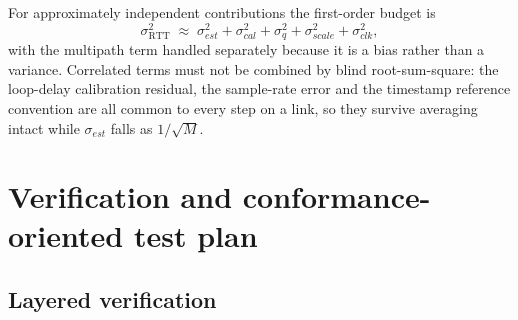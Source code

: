 \documentclass[11pt,a4paper]{article}
\newcommand{\RTT}{\mathrm{RTT}}
\begin{document}
For approximately independent contributions the first-order budget is
\begin{equation}
\sigma_{\RTT}^2 \;\approx\; \sigma_{est}^2 + \sigma_{cal}^2 + \sigma_{q}^2 + \sigma_{scale}^2
   + \sigma_{clk}^2 ,
\label{eq:budget}
\end{equation}
with the multipath term handled separately because it is a bias rather than a variance. Correlated
terms must not be combined by blind root-sum-square: the loop-delay calibration residual, the
sample-rate error and the timestamp reference convention are all common to every step on a link, so
they survive averaging intact while $\sigma_{est}$ falls as $1/\sqrt{M}$.

\section{Verification and conformance-oriented test plan}

\subsection{Layered verification}
\end{document}
